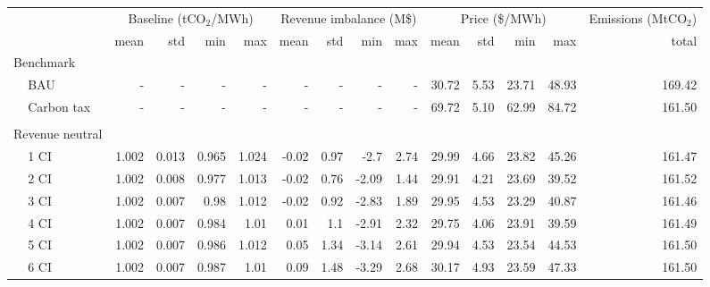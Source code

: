 \begin{tabular}{ll*{13}{r}}
\toprule
              &      & \multicolumn{4}{c}{Baseline (tCO$_{2}$/MWh)} & \multicolumn{4}{c}{Revenue imbalance (M\$)} & \multicolumn{4}{c}{Price (\$/MWh)} & Emissions (MtCO$_{2}$) \\
              &      &                     mean &    std &    min &    max &                    mean &    std &    min &   max &           mean &   std &    min &    max &                  total \\
\midrule
\multicolumn{2}{l}{Benchmark} &&&&&&&&&&&&&\\ & BAU &                        - &      - &      - &      - &                       - &      - &      - &     - &          30.72 &  5.53 &  23.71 &  48.93 &                 169.42 \\
              & Carbon tax &                        - &      - &      - &      - &                       - &      - &      - &     - &          69.72 &  5.10 &  62.99 &  84.72 &                 161.50 \\
&&&&&&&&&&&&&& \\ \multicolumn{2}{l}{Revenue neutral} &&&&&&&&&&&&&\\ & 1 CI &                    1.002 &  0.013 &  0.965 &  1.024 &                   -0.02 &   0.97 &   -2.7 &  2.74 &          29.99 &  4.66 &  23.82 &  45.26 &                 161.47 \\
              & 2 CI &                    1.002 &  0.008 &  0.977 &  1.013 &                   -0.02 &   0.76 &  -2.09 &  1.44 &          29.91 &  4.21 &  23.69 &  39.52 &                 161.52 \\
              & 3 CI &                    1.002 &  0.007 &   0.98 &  1.012 &                   -0.02 &   0.92 &  -2.83 &  1.89 &          29.95 &  4.53 &  23.29 &  40.87 &                 161.46 \\
              & 4 CI &                    1.002 &  0.007 &  0.984 &   1.01 &                    0.01 &    1.1 &  -2.91 &  2.32 &          29.75 &  4.06 &  23.91 &  39.59 &                 161.49 \\
              & 5 CI &                    1.002 &  0.007 &  0.986 &  1.012 &                    0.05 &   1.34 &  -3.14 &  2.61 &          29.94 &  4.53 &  23.54 &  44.53 &                 161.50 \\
              & 6 CI &                    1.002 &  0.007 &  0.987 &   1.01 &                    0.09 &   1.48 &  -3.29 &  2.68 &          30.17 &  4.93 &  23.59 &  47.33 &                 161.50 \\

\end{tabular}
